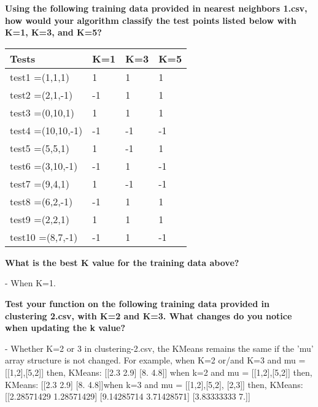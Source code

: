 \documentclass{exam}
\begin{document}
\vspace{5mm}

\vspace{5mm}
\begin{questions}

\question\textbf{ Using the following training data provided in nearest neighbors 1.csv, how would your algorithm classify the test points listed below with K=1, K=3, and K=5?}
\par\normalfont 
\begin{tabular}{ |p{3cm}||p{2cm}|p{2cm}|p{2cm}|  }
 \hline
 Tests& K=1 &K=3&K=5\\
 \hline
    test1 =(1,1,1)& 1& 1& 1\\
    test2 =(2,1,{-1})& -1& 1& 1\\
    test3 =(0,10,1)& 1& 1&  1\\
    test4 =(10,10,{-1})& -1& -1& -1\\
    test5 =(5,5,1)& 1& -1& 1\\
    test6 =(3,10,{-1})& -1& 1& -1\\
    test7 =(9,4,1)& 1& -1& -1 \\
    test8 =(6,2,{-1})& -1& 1& 1\\
    test9 =(2,2,1)& 1& 1& 1\\
    test10 =(8,7,{-1})& -1& 1& -1\\
 \hline
\end{tabular}

\question\textbf{What is the best K value for the training data above?}
\par\normalfont 
- When K=1.

\question\textbf{Test your function on the following training data provided in clustering 2.csv, with K=2 and K=3. What changes do you notice when updating the k value?}
\par\normalfont 
- Whether K=2 or 3 in clustering{-}2.csv, the KMeans remains the same if the 'mu' array structure is not changed. \break 
For example, \hfill\break 
when K=2 or/and K=3 and mu = [[1,2],[5,2]] then, KMeans:  [[2.3 2.9] [8.  4.8]]\hfill \break 
when k=2 and mu = [[1,2],[5,2]] then, KMeans:  [[2.3 2.9] [8.  4.8]]\hfill \break when k=3 and mu = [[1,2],[5,2], [2,3]] then, KMeans:  [[2.28571429 1.28571429] [9.14285714 3.71428571] [3.83333333 7.]] \hfill \break 


\end{questions}
\end{document}
